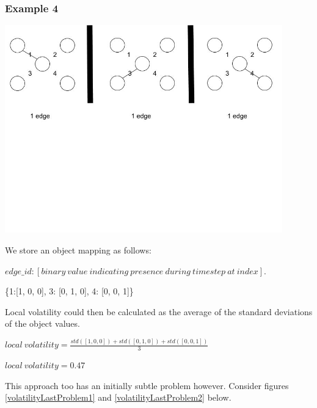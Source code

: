 \begin{center}
\subsubsection*{Example 4}
\includegraphics[trim={0 10cm 0 -1cm}, width=120mm]{./Figures/volatility4.jpg}
\end{center}

We store an object mapping as follows:

$edge\_id: [binary\ value\ indicating\ presence\ during\ timestep\ at\ index].$

\begin{center}
\{1:[1, 0, 0], 3: [0, 1, 0], 4: [0, 0, 1]\}
\end{center}
Local volatility could then be calculated as the average of the standard deviations of the object values.
\begin{center}
$local\ volatility = \frac{std([1,0,0]) + std([0,1,0]) + std([0,0,1])}{3}$

$local\ volatility = 0.47$
\end{center}

This approach too has an initially subtle problem however. Consider figures \ref{volatilityLastProblem1} and \ref{volatilityLastProblem2} below.

